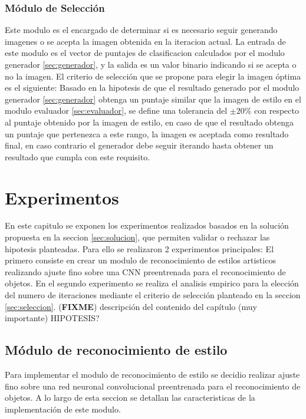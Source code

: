\documentclass[a4paper,11pt,spanish]{book}
\newcommand*{\FIXME}[1]{{(\textbf{FIXME}) {#1}}}
\begin{document}
    \subsection{Módulo de Selección \label{sec:seleccion}}
      Este modulo es el encargado de determinar si es necesario seguir generando imagenes o se acepta la imagen obtenida en la iteracion actual. La entrada de este modulo
      es el vector de puntajes de clasificacion calculados por el modulo generador \ref{sec:generador}, y la salida es un valor binario indicando si se acepta o no la imagen.
      El criterio de selección que se propone para elegir la imagen óptima es el siguiente:
      Basado en la hipotesis de que el resultado generado por el modulo generador \ref{sec:generador} obtenga un puntaje similar que la imagen de estilo en el modulo evaluador
      \ref{sec:evaluador}, se define una tolerancia del $\pm 20\%$ con respecto al puntaje obtenido por la imagen de estilo, en caso de que el resultado obtenga un puntaje que pertenezca
      a este rango, la imagen es aceptada como resultado final, en caso contrario el generador debe seguir iterando hasta obtener un resultado que cumpla con este requisito.


\chapter{Experimentos}
 En este capitulo se exponen los experimentos realizados basados en la solución propuesta en la seccion \ref{sec:solucion}, que permiten validar o rechazar las hipotesis planteadas.
 Para ello se realizaron 2 experimentos principales: El primero consiste en crear un modulo de reconocimiento de estilos artisticos realizando ajuste fino sobre una CNN preentrenada
 para el reconocimiento de objetos. En el segundo experimento se realiza el analisis empirico para la elección del numero de iteraciones mediante el criterio de selección planteado en la
 seccion \ref{sec:seleccion}.
 \FIXME{descripción del contenido del capítulo (muy importante) HIPOTESIS?}

\section{Módulo de reconocimiento de estilo}
  Para implementar el modulo de reconocimiento de estilo se decidio realizar ajuste fino sobre una red neuronal convolucional preentrenada para el reconocimiento de objetos.
  A lo largo de esta seccion se detallan las caracteristicas de la implementación de este modulo.
\end{document}
